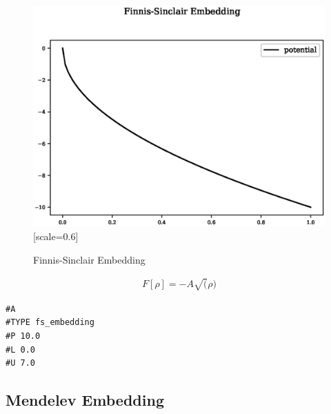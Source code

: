 \documentclass[12pt,twoside]{manual}
\begin{document}
\begin{appendices}
\begin{figure}[h]
  \begin{center}
    \includegraphics{img/plots/fs_embedding.eps}[scale=0.6]
    \caption{Finnis-Sinclair Embedding}
    \label{graph:graph1}
  \end{center}
\end{figure}

\begin{equation}
\begin{split}
F[\rho] = -A \sqrt(\rho)
\end{split}
\label{eq:fsEmbedding}
\end{equation}

\begin{lstlisting}[style=pseudocode,caption={Finnis-Sinclair Embedding}]
#A
#TYPE fs_embedding
#P 10.0
#L 0.0
#U 7.0
\end{lstlisting}


\subsection{Mendelev Embedding}


\end{appendices}
\end{document}
